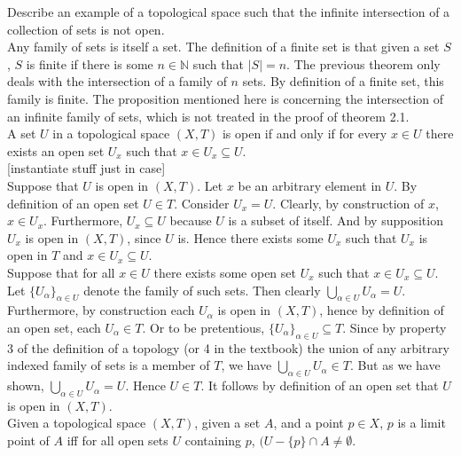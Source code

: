 \documentclass{article}
\theoremstyle{definition}
\newcommand{\N}{\mathbb{N}}
\begin{document}
 Describe an example of a topological space such that the infinite intersection of a collection of sets is not open.\\

 Any family of sets is itself a set. The definition of a finite set is that given a set $S$, $S$ is finite if there is some $n\in \N$ such that $|S| = n$. The previous theorem only deals with the intersection of a family of $n$ sets. By definition of a finite set, this family is finite. The proposition mentioned here is concerning the intersection of an infinite family of sets, which is not treated in the proof of theorem 2.1.\\

 A set $U$ in a topological space $(X, T )$ is open if and only if
for every $x \in U$ there exists an open set $U_x$ such that $x \in U_x \subseteq U$.\\

 [instantiate stuff just in case]\\

Suppose that $U$ is open in $(X,T)$. Let $x$ be an arbitrary element in $U$. By definition of an open set $U\in T$. Consider $U_x = U$. Clearly, by construction of $x$, $x\in U_x$. Furthermore, $U_x\subseteq U$ because $U$ is a subset of itself. And by supposition $U_x$ is open in $(X,T)$, since $U$ is. Hence there exists some $U_x$ such that $U_x$ is open in $T$ and $x\in U_x \subseteq U$.\\

Suppose that for all $x\in U$ there exists some open set $U_x$ such that $x\in U_x \subseteq U$. Let $\{U_\alpha\}_{\alpha\in U}$ denote the family of such sets. Then clearly $\bigcup_{\alpha\in U}U_\alpha = U$. Furthermore, by construction each $U_\alpha$ is open in $(X,T)$, hence by definition of an open set, each $U_\alpha\in T$. Or to be pretentious, $ \{U_\alpha\}_{\alpha\in U}\subseteq T$. Since by property 3 of the definition of a topology (or 4 in the textbook) the union of any arbitrary indexed family of sets is a member of $T$, we have $\bigcup_{\alpha\in U}U_\alpha\in T$. But as we have shown, $\bigcup_{\alpha\in U}U_\alpha = U$. Hence $U\in T$. It follows by definition of an open set that $U$ is open in $(X,T)$.\\

 Given a topological space $(X,T)$, given a set $A$, and a point $p\in X$, $p$ is a limit point of $A$ iff for all open sets $U$ containing $p$, $(U - \{p\}\cap A \ne \emptyset$. 
\end{document}
